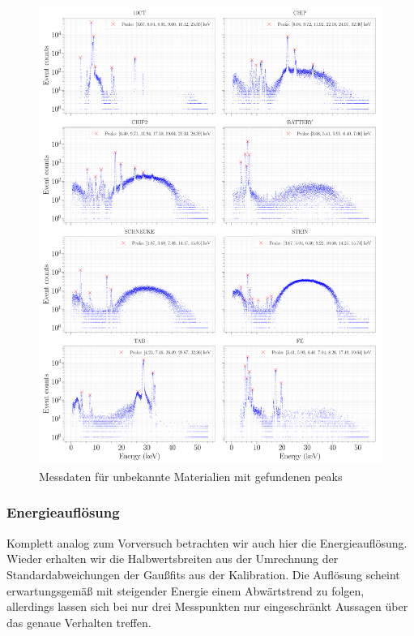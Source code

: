\documentclass[a4paper,14pt]{article}
\begin{document}
\begin{figure}[H]
\centering
\includegraphics[width=\textwidth]{../Figures/XRay-analysis.pdf}
\caption{Messdaten für unbekannte Materialien mit gefundenen peaks}
\label{XRay_analysis}
\end{figure}

\subsubsection{Energieauflösung}
Komplett analog zum Vorversuch betrachten wir auch hier die Energieauflösung. Wieder erhalten wir die Halbwertsbreiten aus der Umrechnung der Standardabweichungen der Gaußfits aus der Kalibration. Die Auflösung scheint erwartungsgemäß mit steigender Energie einem Abwärtstrend zu folgen, allerdings lassen sich bei nur drei Messpunkten nur eingeschränkt Aussagen über das genaue Verhalten treffen.
\end{document}
